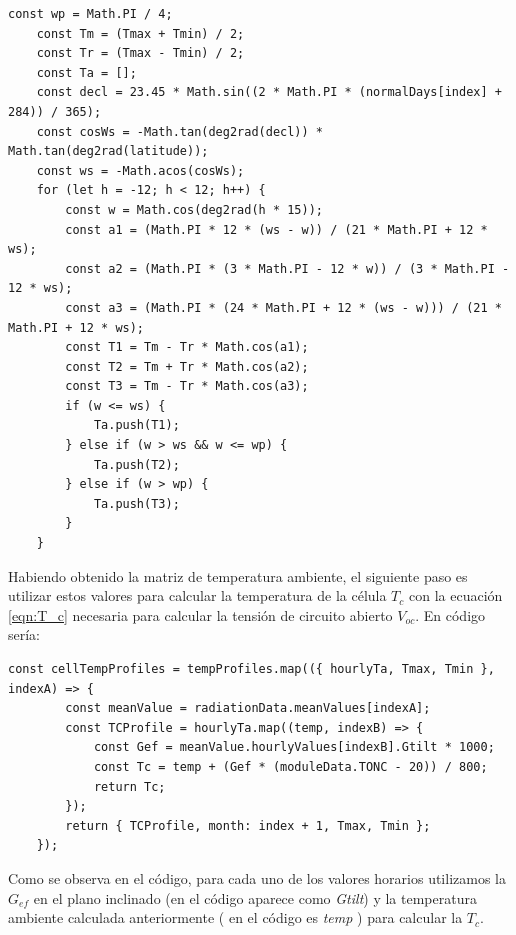 \begin{lstlisting}[style=ES6, caption={Cálculo de la temperatura ambiente}]
	const wp = Math.PI / 4;
	const Tm = (Tmax + Tmin) / 2;
	const Tr = (Tmax - Tmin) / 2;
	const Ta = [];
	const decl = 23.45 * Math.sin((2 * Math.PI * (normalDays[index] + 284)) / 365);
	const cosWs = -Math.tan(deg2rad(decl)) * Math.tan(deg2rad(latitude));
	const ws = -Math.acos(cosWs);
	for (let h = -12; h < 12; h++) {
		const w = Math.cos(deg2rad(h * 15));
		const a1 = (Math.PI * 12 * (ws - w)) / (21 * Math.PI + 12 * ws);
		const a2 = (Math.PI * (3 * Math.PI - 12 * w)) / (3 * Math.PI - 12 * ws);
		const a3 = (Math.PI * (24 * Math.PI + 12 * (ws - w))) / (21 * Math.PI + 12 * ws);
		const T1 = Tm - Tr * Math.cos(a1);
		const T2 = Tm + Tr * Math.cos(a2);
		const T3 = Tm - Tr * Math.cos(a3);
		if (w <= ws) {
			Ta.push(T1);
		} else if (w > ws && w <= wp) {
			Ta.push(T2);
		} else if (w > wp) {
			Ta.push(T3);
		}
	}
\end{lstlisting}

Habiendo obtenido la matriz de temperatura ambiente, el siguiente paso es utilizar estos valores para calcular la temperatura de la célula $T_c$ con la ecuación \ref{eqn:T_c} necesaria para calcular la tensión de circuito abierto $V_{oc}$.
\newpage
En código sería:
\begin{lstlisting}[style=ES6, caption={Cálculo de la temperatura de célula}]
	const cellTempProfiles = tempProfiles.map(({ hourlyTa, Tmax, Tmin }, indexA) => {
		const meanValue = radiationData.meanValues[indexA];
		const TCProfile = hourlyTa.map((temp, indexB) => {
			const Gef = meanValue.hourlyValues[indexB].Gtilt * 1000;
			const Tc = temp + (Gef * (moduleData.TONC - 20)) / 800; 
			return Tc;
		});
		return { TCProfile, month: index + 1, Tmax, Tmin };
	});
\end{lstlisting}

Como se observa en el código, para cada uno de los valores horarios utilizamos la $G_{ef}$ en el plano inclinado (en el código aparece como \textit{Gtilt}) y la temperatura ambiente calculada anteriormente ( en el código es \textit{temp} ) para calcular la $T_c$.

